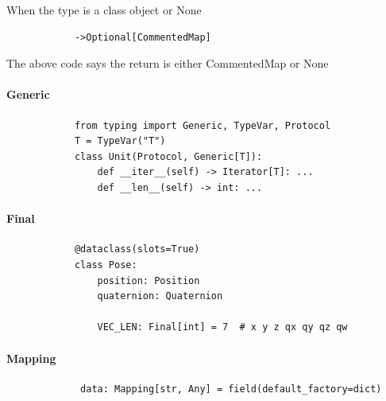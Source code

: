         When the type is a class object or None
        
        \begin{verbatim}
            ->Optional[CommentedMap]
        \end{verbatim}
        
        The above code says the return is either CommentedMap or None

    \paragraph{Generic}
        \begin{verbatim}
            from typing import Generic, TypeVar, Protocol
            T = TypeVar("T")
            class Unit(Protocol, Generic[T]):
                def __iter__(self) -> Iterator[T]: ...
                def __len__(self) -> int: ...
        \end{verbatim}
    
    \paragraph{Final}
        \begin{verbatim}
            @dataclass(slots=True)
            class Pose:
                position: Position
                quaternion: Quaternion
            
                VEC_LEN: Final[int] = 7  # x y z qx qy qz qw
        \end{verbatim}
    \paragraph{Mapping}
        \begin{verbatim}
             data: Mapping[str, Any] = field(default_factory=dict)
        \end{verbatim}
    